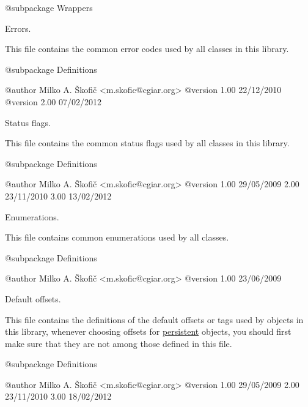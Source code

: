 \begin{DoxyVerb}    @subpackage     Wrappers\end{DoxyVerb}


Errors.

This file contains the common error codes used by all classes in this library.

\begin{DoxyVerb}    @subpackage     Definitions

    @author         Milko A. Škofič <m.skofic@cgiar.org>
    @version        1.00 22/12/2010
    @version        2.00 07/02/2012\end{DoxyVerb}


Status flags.

This file contains the common status flags used by all classes in this library.

\begin{DoxyVerb}    @subpackage     Definitions

    @author         Milko A. Škofič <m.skofic@cgiar.org>
    @version        1.00 29/05/2009
                            2.00 23/11/2010
                            3.00 13/02/2012\end{DoxyVerb}


Enumerations.

This file contains common enumerations used by all classes.

\begin{DoxyVerb}    @subpackage     Definitions

    @author         Milko A. Škofič <m.skofic@cgiar.org>
    @version        1.00 23/06/2009\end{DoxyVerb}


\begin{DoxyVerb}   Default offsets.\end{DoxyVerb}
 This file contains the definitions of the default offsets or tags used by objects in this library, whenever choosing offsets for \hyperlink{class_c_persistent_object}{persistent} objects, you should first make sure that they are not among those defined in this file.

\begin{DoxyVerb}    @subpackage     Definitions

    @author         Milko A. Škofič <m.skofic@cgiar.org>
    @version        1.00 29/05/2009
                            2.00 23/11/2010
                            3.00 18/02/2012\end{DoxyVerb}


